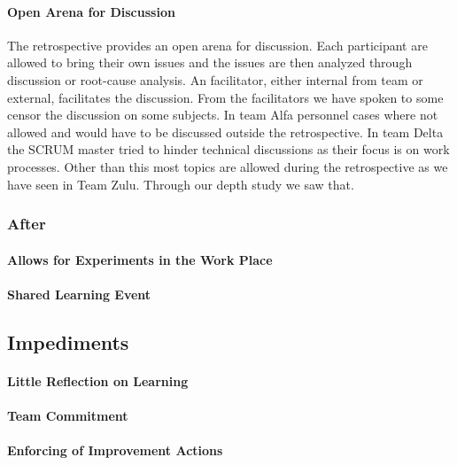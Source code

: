 \paragraph{Open Arena for Discussion}
The retrospective provides an open arena for discussion. Each participant are allowed to bring their own issues and the issues are then analyzed through discussion or root-cause analysis. An facilitator, either internal from team or external, facilitates the discussion. From the facilitators we have spoken to some censor the discussion on some subjects. In team Alfa personnel cases where not allowed and would have to be discussed outside the retrospective. In team Delta the SCRUM master tried to hinder technical discussions as their focus is on work processes. Other than this most topics are allowed during the retrospective as we have seen in Team Zulu. Through our depth study we saw that.

\subsubsection{After}
\paragraph{Allows for Experiments in the Work Place}

\paragraph{Shared Learning Event}


\subsection{Impediments}
\paragraph{Little Reflection on Learning}
\paragraph{Team Commitment}
\paragraph{Enforcing of Improvement Actions}

